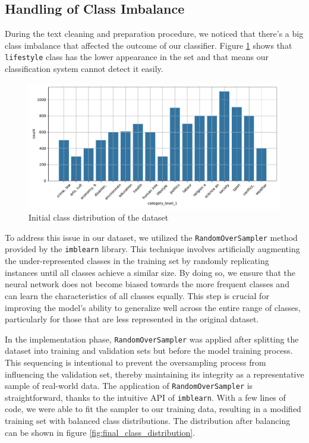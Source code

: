 \subsection{Handling of Class Imbalance}
During the text cleaning and preparation procedure, we noticed that there's a big class imbalance that affected the outcome of our classifier. Figure \ref{fig:initial_class_distribution} shows that \verb|lifestyle| class has the lower appearance in the set and that means our classification system cannot detect it easily.

\begin{figure}[htpb]
	\centering
	\includegraphics[width=\linewidth]{Images/initial_class_distribution.pdf}
	\caption{Initial class distribution of the dataset}
	\label{fig:initial_class_distribution}
\end{figure}

To address this issue in our dataset, we utilized the \verb|RandomOverSampler| method provided by the \verb|imblearn| library. This technique involves artificially augmenting the under-represented classes in the training set by randomly replicating instances until all classes achieve a similar size. By doing so, we ensure that the neural network does not become biased towards the more frequent classes and can learn the characteristics of all classes equally. This step is crucial for improving the model's ability to generalize well across the entire range of classes, particularly for those that are less represented in the original dataset.

In the implementation phase, \verb|RandomOverSampler| was applied after splitting the dataset into training and validation sets but before the model training process. This sequencing is intentional to prevent the oversampling process from influencing the validation set, thereby maintaining its integrity as a representative sample of real-world data. The application of \verb|RandomOverSampler| is straightforward, thanks to the intuitive API of \verb|imblearn|. With a few lines of code, we were able to fit the sampler to our training data, resulting in a modified training set with balanced class distributions. The distribution after balancing can be shown in figure \ref{fig:final_class_distribution}.


